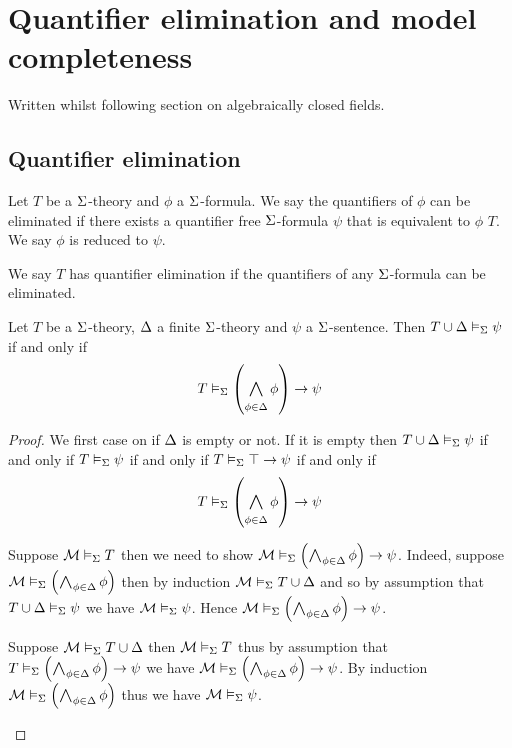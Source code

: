 \section{Quantifier elimination and model completeness}
Written whilst following section on algebraically closed fields.
\subsection{Quantifier elimination}

\begin{dfn}
    Let $T$ be a $\Sigma$-theory and $\phi$ a $\Sigma$-formula.
    We say the quantifiers of $\phi$ can be eliminated if there exists a
    quantifier free $\Sigma$-formula $\psi$ that is equivalent to $\phi$ 
     $T$.
    We say $\phi$ is reduced to $\psi$.

    We say $T$ has quantifier elimination if the quantifiers of any 
    $\Sigma$-formula can be eliminated.
\end{dfn}

\begin{lem}[Deduction]
    Let $T$ be a $\Sigma$-theory, $\Delta$ a finite $\Sigma$-theory and 
    $\psi$ a $\Sigma$-sentence.
    Then $T \cup \Delta \vDash_{\Sigma} \psi$ if and only if 
    \[T \model{\Si} \brkt{\bigand{\phi \in \De}{} \phi} \to \psi\]
\end{lem}
\begin{proof}
    We first case on if $\Delta$ is empty or not.
    If it is empty then $T \cup \Delta \vDash_{\Sigma} \psi$ if and only if
    $T \vDash_{\Sigma} \psi$ if and only if $T \vDash_{\Sigma} \top \to \psi$
    if and only if 
    \[T \model{\Si} \brkt{\bigand{\phi \in \De}{} \phi} \to \psi\]
    \begin{forward}
        Suppose $\mathcal{M} \vDash_{\Sigma} T$ then we need to show 
        $\MM \model{\Si} \brkt{\bigand{\phi \in \De}{} \phi} \to \psi$. 
        Indeed, suppose $\MM \model{\Si} \brkt{\bigand{\phi \in \De}{} \phi}$ 
        then by induction $\mathcal{M} \vDash_{\Sigma} T \cup \Delta$ and so by assumption
        that $T \cup \Delta \vDash_{\Sigma} \psi$ we have 
        $\mathcal{M} \vDash_{\Sigma} \psi$. 
        Hence $\MM \model{\Si} \brkt{\bigand{\phi \in \De}{} \phi} \to \psi$.
    \end{forward}

    \begin{backward}
        Suppose $\mathcal{M} \vDash_{\Sigma} T \cup \Delta$ then 
        $\mathcal{M} \vDash_{\Sigma} T$ thus by assumption that 
        $T \model{\Si} \brkt{\bigand{\phi \in \De}{} \phi} \to \psi$
        we have $\MM \model{\Si} \brkt{\bigand{\phi \in \De}{} \phi} \to \psi$.
        By induction $\MM \model{\Si} \brkt{\bigand{\phi \in \De}{} \phi}$ 
        thus we have $\mathcal{M} \vDash_{\Sigma} \psi$.
    \end{backward}
\end{proof}

